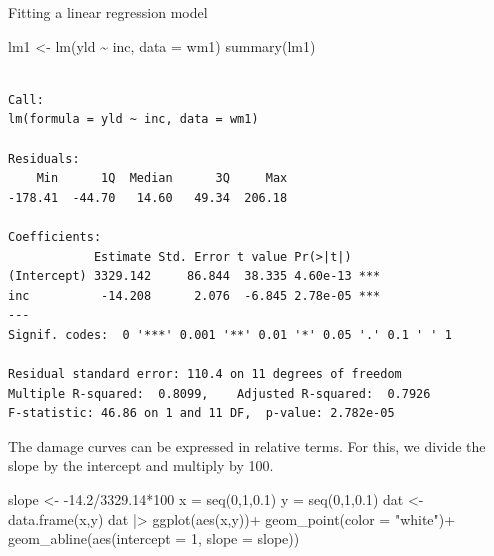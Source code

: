 \documentclass[
  letterpaper,
  DIV=11,
  numbers=noendperiod]{scrreprt}
\newenvironment{Shaded}{\begin{snugshade}}{\end{snugshade}}
\newcommand{\AttributeTok}[1]{\textcolor[rgb]{0.40,0.45,0.13}{#1}}
\newcommand{\DecValTok}[1]{\textcolor[rgb]{0.68,0.00,0.00}{#1}}
\newcommand{\FloatTok}[1]{\textcolor[rgb]{0.68,0.00,0.00}{#1}}
\newcommand{\FunctionTok}[1]{\textcolor[rgb]{0.28,0.35,0.67}{#1}}
\newcommand{\NormalTok}[1]{\textcolor[rgb]{0.00,0.23,0.31}{#1}}
\newcommand{\OtherTok}[1]{\textcolor[rgb]{0.00,0.23,0.31}{#1}}
\newcommand{\SpecialCharTok}[1]{\textcolor[rgb]{0.37,0.37,0.37}{#1}}
\newcommand{\StringTok}[1]{\textcolor[rgb]{0.13,0.47,0.30}{#1}}
\begin{document}
Fitting a linear regression model

\begin{Shaded}
\begin{Highlighting}[]
\NormalTok{lm1 }\OtherTok{\textless{}{-}}  \FunctionTok{lm}\NormalTok{(yld }\SpecialCharTok{\textasciitilde{}}\NormalTok{ inc, }\AttributeTok{data =}\NormalTok{ wm1) }
\FunctionTok{summary}\NormalTok{(lm1)}
\end{Highlighting}
\end{Shaded}

\begin{verbatim}

Call:
lm(formula = yld ~ inc, data = wm1)

Residuals:
    Min      1Q  Median      3Q     Max 
-178.41  -44.70   14.60   49.34  206.18 

Coefficients:
            Estimate Std. Error t value Pr(>|t|)    
(Intercept) 3329.142     86.844  38.335 4.60e-13 ***
inc          -14.208      2.076  -6.845 2.78e-05 ***
---
Signif. codes:  0 '***' 0.001 '**' 0.01 '*' 0.05 '.' 0.1 ' ' 1

Residual standard error: 110.4 on 11 degrees of freedom
Multiple R-squared:  0.8099,    Adjusted R-squared:  0.7926 
F-statistic: 46.86 on 1 and 11 DF,  p-value: 2.782e-05
\end{verbatim}

The damage curves can be expressed in relative terms. For this, we
divide the slope by the intercept and multiply by 100.

\begin{Shaded}
\begin{Highlighting}[]
\NormalTok{slope }\OtherTok{\textless{}{-}} \SpecialCharTok{{-}}\FloatTok{14.2}\SpecialCharTok{/}\FloatTok{3329.14}\SpecialCharTok{*}\DecValTok{100}
\NormalTok{x }\OtherTok{=} \FunctionTok{seq}\NormalTok{(}\DecValTok{0}\NormalTok{,}\DecValTok{1}\NormalTok{,}\FloatTok{0.1}\NormalTok{)}
\NormalTok{y }\OtherTok{=} \FunctionTok{seq}\NormalTok{(}\DecValTok{0}\NormalTok{,}\DecValTok{1}\NormalTok{,}\FloatTok{0.1}\NormalTok{)}
\NormalTok{dat }\OtherTok{\textless{}{-}} \FunctionTok{data.frame}\NormalTok{(x,y)}
\NormalTok{dat }\SpecialCharTok{|\textgreater{}} 
  \FunctionTok{ggplot}\NormalTok{(}\FunctionTok{aes}\NormalTok{(x,y))}\SpecialCharTok{+}
  \FunctionTok{geom\_point}\NormalTok{(}\AttributeTok{color =} \StringTok{"white"}\NormalTok{)}\SpecialCharTok{+}  
  \FunctionTok{geom\_abline}\NormalTok{(}\FunctionTok{aes}\NormalTok{(}\AttributeTok{intercept =} \DecValTok{1}\NormalTok{, }\AttributeTok{slope =}\NormalTok{ slope))}
\end{Highlighting}
\end{Shaded}
\end{document}
